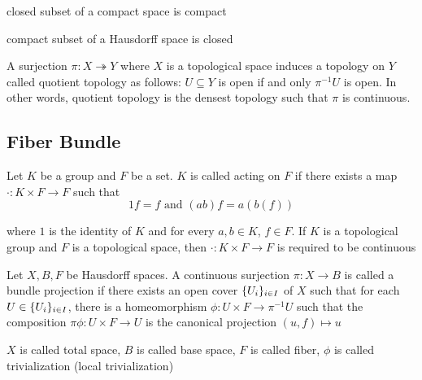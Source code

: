 \begin{proposition}
	closed subset of a compact space is compact
\end{proposition}

\begin{proposition}
	compact subset of a Hausdorff space is closed
\end{proposition}

\begin{definition}
	A surjection $\pi: X \twoheadrightarrow Y$ where $X$ is a topological space induces a topology on $Y$ called quotient topology as follows: $U \subseteq Y$ is open if and only $\pi^{-1} U$ is open. In other words, quotient topology is the densest topology such that $\pi$ is continuous.
\end{definition}

\subsection{Fiber Bundle}

\begin{definition}
	Let $K$ be a group and $F$ be a set. $K$ is called acting on $F$ if there exists a map $\cdot: K \times F \to F$ such that
	$$
	1 f = f \text{ and } (ab) f = a(b(f))
	$$
	
	where $1$ is the identity of $K$ and for every $a, b \in K$, $f \in F$. If $K$ is a topological group and $F$ is a topological space, then $\cdot: K \times F \to F$ is required to be continuous
\end{definition}

\begin{definition}
	Let $X, B, F$ be Hausdorff spaces. A continuous surjection $\pi: X \to B$ is called a bundle projection if there exists an open cover $\{U_i\}_{i \in I}$ of $X$ such that for each $U \in \{U_i\}_{i \in I}$, there is a homeomorphism $\phi: U \times F \to \pi^{-1} U$ such that the composition $\pi \phi: U \times F \to U$ is the canonical projection $(u, f) \mapsto u$
	\begin{center}
	\end{center}
	
	$X$ is called total space, $B$ is called base space, $F$ is called fiber, $\phi$ is called trivialization (local trivialization)
\end{definition}

